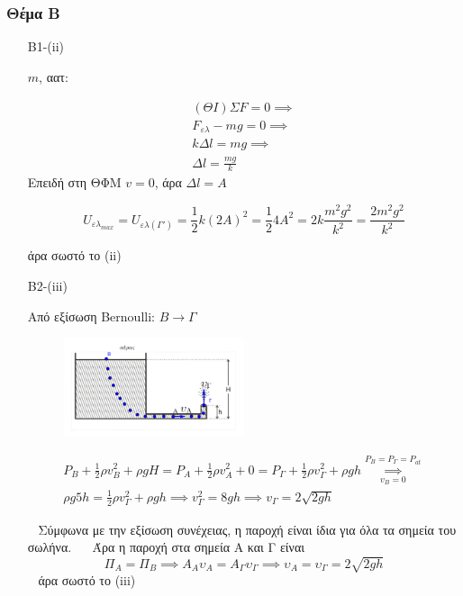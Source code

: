 \documentclass[12pt]{article}
\begin{document}
  \part*{}

  \section*{Θέμα Β}
  \begin{enumerate}
    \item [B1-(ii)]

    $m$, αατ:

    \begin{gather*}
    (ΘΙ) ΣF=0 \implies \\ F_{ελ}-mg=0 \implies \\ kΔl=mg \implies \\ Δl=\frac{mg}{k}
    \end{gather*}
    Επειδή στη ΘΦΜ $v=0$, άρα $Δl=A$



    $$U_{ελ_{max}}= U_{ελ(Γ')}=\frac{1}{2}k\left(2A\right)^2=\frac{1}{2}4A^2=2k\frac{m^2g^2}{k^2}=\frac{2m^2g^2}{k^2}$$

    άρα σωστό το (ii)

    \item [B2-(iii)]

    Από εξίσωση Bernoulli: $Β\to Γ$
    \begin{figure}[h]
      \includegraphics[width=0.5\textwidth]{ΦυσικήΒ2.png}
      \centering
    \end{figure}

    \begin{gather*}
      P_B + \frac{1}{2}ρv_Β^2+ρgH=P_Α+\frac{1}{2}ρv_Α^2+0=
      P_Γ+\frac{1}{2}ρv_Γ^2+ρgh\overset{P_Β=P_Γ=P_{at}}{\underset{v_Β=0}{\implies}}\\
      ρg5h=\frac{1}{2}ρv_Γ^2+ρgh\implies v_Γ^2=8gh\implies v_Γ=2\sqrt{2gh}
    \end{gather*}

    Σύμφωνα με την εξίσωση συνέχειας, η παροχή είναι ίδια για όλα τα σημεία του σωλήνα.
    Άρα η παροχή στα σημεία Α και Γ είναι
    $$Π_Α = Π_Β \implies A_A υ_Α = Α_Γ υ_Γ \implies υ_Α = υ_Γ = 2 \sqrt{2gh}$$
    άρα σωστό το (iii)


\end{enumerate}
\end{document}
